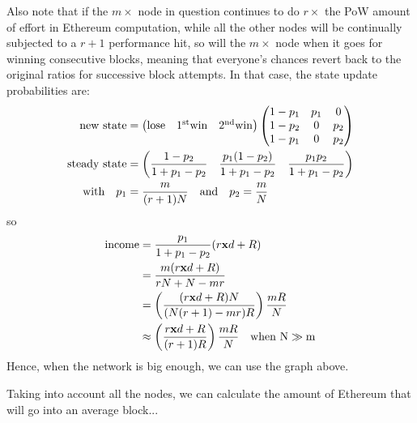 \documentclass[10pt,a4paper]{article}
\begin{document}
Also note that if the $m\times$ node in question continues to do $r\times$ the PoW amount of effort in Ethereum computation, while all the other nodes will be continually subjected to a $r+1$ performance hit, so will the $m\times$ node when it goes for winning consecutive blocks, meaning that everyone's chances revert back to the original ratios for successive block attempts. In that case, the state update probabilities are:
\begin{align}
\mathrm{new\ state} &= 
\left(
\begin{matrix}
\mathrm{lose} & \mathrm{1^{st}win} & \mathrm{2^{nd}win}
\end{matrix}
\right)
\left(
\begin{matrix}
1 - p_1 & p_1 & 0 \\
1 - p_2 & 0 & p_2 \\
1 - p_1 & 0 & p_2 \\ 
\end{matrix}
\right) \\
\mathrm{steady\ state} &= 
\left(
\frac{1 - p_2}{1 + p_1 - p_2} \quad \frac{p_1(1-p_2)}{1 + p_1 - p_2} \quad \frac{p_1 p_2}{1 + p_1 - p_2}
\right) \\
\mathrm{with}\quad p_1 &= \frac{m}{(r+1){N}} \quad\mathrm{and}\quad p_2 = \frac{m}{{N}}\\
\end{align}
so
\begin{align}
\mathrm{income} &= \frac{p_1}{1 + p_1 - p_2} ( r{\mathbf x} d + {R} ) \\
 &= \frac{m(r{\mathbf x} d + {R})}{r{N} + {N} -mr} \\
 &= \left( \frac{(r{\mathbf x} d + {R}){N}}{({N}(r+1)-mr){R}} \right) \frac{m{R}}{{N}} \\
 &\approx \left(\frac{r{\mathbf x} d + {R}}{(r+1){R}}\right) \frac{m{R}}{N} \quad \mathrm{when\ {N}\gg m}
\end{align}
Hence, when the network is big enough, we can use the graph above.

Taking into account all the nodes, we can calculate the amount of Ethereum that will go into an average block...
\end{document}
